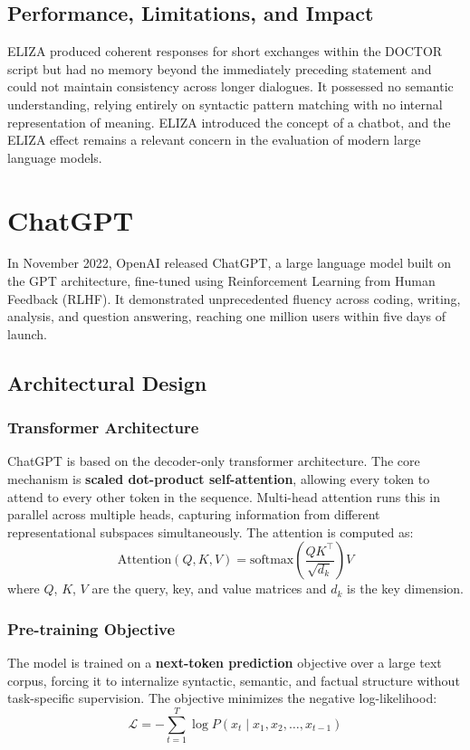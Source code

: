\documentclass[12pt,a4paper]{report}
\begin{document}
\subsection{Performance, Limitations, and Impact}
ELIZA produced coherent responses for short exchanges within the DOCTOR script but had no memory beyond the immediately preceding statement and could not maintain consistency across longer dialogues. It possessed no semantic understanding, relying entirely on syntactic pattern matching with no internal representation of meaning. ELIZA introduced the concept of a chatbot, and the ELIZA effect remains a relevant concern in the evaluation of modern large language models.

\section{ChatGPT}
In November 2022, OpenAI released ChatGPT, a large language model built on the GPT architecture, fine-tuned using Reinforcement Learning from Human Feedback (RLHF). It demonstrated unprecedented fluency across coding, writing, analysis, and question answering, reaching one million users within five days of launch.

\subsection{Architectural Design}

\subsubsection{Transformer Architecture}
ChatGPT is based on the decoder-only transformer architecture. The core mechanism is \textbf{scaled dot-product self-attention}, allowing every token to attend to every other token in the sequence. Multi-head attention runs this in parallel across multiple heads, capturing information from different representational subspaces simultaneously. The attention is computed as:
\[
\text{Attention}(Q, K, V) = \text{softmax}\!\left(\frac{QK^\top}{\sqrt{d_k}}\right)V
\]
where $Q$, $K$, $V$ are the query, key, and value matrices and $d_k$ is the key dimension.

\subsubsection{Pre-training Objective}
The model is trained on a \textbf{next-token prediction} objective over a large text corpus, forcing it to internalize syntactic, semantic, and factual structure without task-specific supervision. The objective minimizes the negative log-likelihood:
\[
\mathcal{L} = -\sum_{t=1}^{T} \log P(x_t \mid x_1, x_2, \ldots, x_{t-1})
\]
\end{document}
